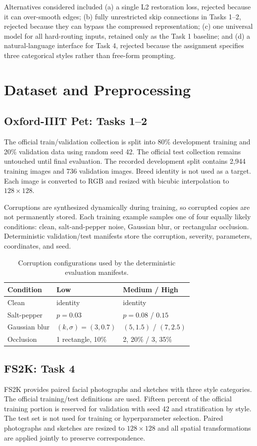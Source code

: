 \documentclass[conference]{IEEEtran}
\begin{document}
Alternatives considered included (a) a single L2 restoration loss, rejected because it can over-smooth edges; (b) fully unrestricted skip connections in Tasks 1--2, rejected because they can bypass the compressed representation; (c) one universal model for all hard-routing inputs, retained only as the Task 1 baseline; and (d) a natural-language interface for Task 4, rejected because the assignment specifies three categorical styles rather than free-form prompting.

\section{Dataset and Preprocessing}
\subsection{Oxford-IIIT Pet: Tasks 1--2}
The official train/validation collection is split into 80\% development training and 20\% validation data using random seed 42. The official test collection remains untouched until final evaluation. The recorded development split contains 2,944 training images and 736 validation images. Breed identity is not used as a target. Each image is converted to RGB and resized with bicubic interpolation to $128\times128$.

Corruptions are synthesized dynamically during training, so corrupted copies are not permanently stored. Each training example samples one of four equally likely conditions: clean, salt-and-pepper noise, Gaussian blur, or rectangular occlusion. Deterministic validation/test manifests store the corruption, severity, parameters, coordinates, and seed.

\begin{table}[t]
\caption{Corruption configurations used by the deterministic evaluation manifests.}
\label{tab:corruptions}
\centering
\begin{tabular}{lll}
\toprule
Condition & Low & Medium / High\\
\midrule
Clean & identity & identity\\
Salt-pepper & $p=0.03$ & $p=0.08$ / $0.15$\\
Gaussian blur & $(k,\sigma)=(3,0.7)$ & $(5,1.5)$ / $(7,2.5)$\\
Occlusion & 1 rectangle, 10\% & 2, 20\% / 3, 35\%\\
\bottomrule
\end{tabular}
\end{table}

\subsection{FS2K: Task 4}
FS2K provides paired facial photographs and sketches with three style categories. The official training/test definitions are used. Fifteen percent of the official training portion is reserved for validation with seed 42 and stratification by style. The test set is not used for training or hyperparameter selection. Paired photographs and sketches are resized to $128\times128$ and all spatial transformations are applied jointly to preserve correspondence.
\end{document}
